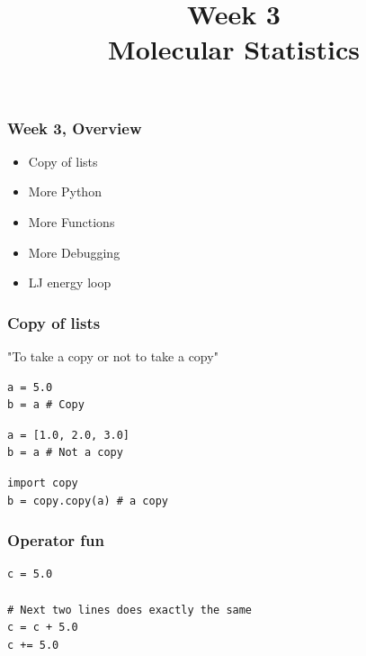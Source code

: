 

\usepackage{soul}

\title[]{Week 3\\Molecular Statistics}








{
\usebackgroundtemplate{}
\begin{frame}[plain]
    \titlepage
    \addtocounter{framenumber}{-1}
\end{frame}
}

\begin{frame}[fragile]

    \frametitle{Week 3, Overview}

    \begin{itemize}
        \item Copy of lists
        \item More Python
        \item More Functions
        \item More Debugging
        \item LJ energy loop
    \end{itemize}

\end{frame}


\begin{frame}[fragile]

    \frametitle{Copy of lists}

    "To take a copy or not to take a copy"

    \bigskip

\begin{lstlisting}
a = 5.0
b = a # Copy
\end{lstlisting}

\begin{lstlisting}
a = [1.0, 2.0, 3.0]
b = a # Not a copy
\end{lstlisting}

\begin{lstlisting}
import copy
b = copy.copy(a) # a copy
\end{lstlisting}

\end{frame}


\begin{frame}[fragile]

    \frametitle{Operator fun}

\begin{lstlisting}
c = 5.0

# Next two lines does exactly the same
c = c + 5.0
c += 5.0
\end{lstlisting}

\end{frame}


